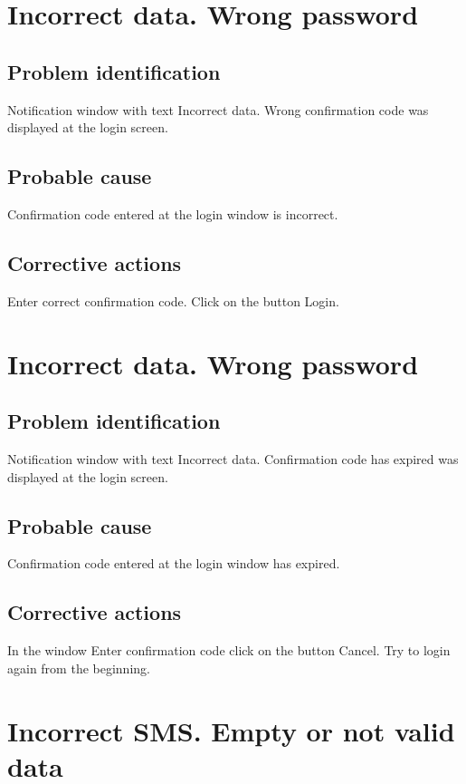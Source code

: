 \section{Incorrect data. Wrong password}

\subsection{Problem identification}
Notification window with text Incorrect data. Wrong confirmation code
was displayed at the login screen.

\subsection{Probable cause}
Confirmation code entered at the login window is incorrect.

\subsection{Corrective actions}
Enter correct confirmation code. Click on the button Login.


\section{Incorrect data. Wrong password}

\subsection{Problem identification}
Notification window with text Incorrect data. Confirmation code has
expired was displayed at the login screen.

\subsection{Probable cause}
Confirmation code entered at the login window has expired.

\subsection{Corrective actions}
In the window Enter confirmation code click on the button Cancel. 
Try to login again from the beginning.

\section{Incorrect SMS. Empty or not valid data}

